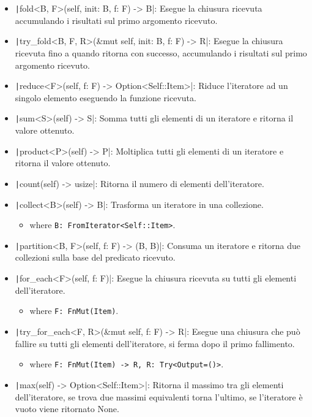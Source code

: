 \begin{itemize}
  \item \texttt|fold<B, F>(self, init: B, f: F) -> B|: Esegue la chiusura ricevuta accumulando i risultati sul primo argomento ricevuto.
  \item \texttt|try_fold<B, F, R>(&mut self, init: B, f: F) -> R|: Esegue la chiusura ricevuta fino a quando ritorna con successo, accumulando i risultati sul primo argomento ricevuto.
  \item \texttt|reduce<F>(self, f: F) -> Option<Self::Item>|: Riduce l'iteratore ad un singolo elemento eseguendo la funzione ricevuta.
  \item \texttt|sum<S>(self) -> S|: Somma tutti gli elementi di un iteratore e ritorna il valore ottenuto.
  \item \texttt|product<P>(self) -> P|: Moltiplica tutti gli elementi di un iteratore e ritorna il valore ottenuto.
  \item \texttt|count(self) -> usize|: Ritorna il numero di elementi dell'iteratore.
  \item \texttt|collect<B>(self) -> B|: Trasforma un iteratore in una collezione.
        \begin{itemize}
          \item[] where \verb|B: FromIterator<Self::Item>|.
        \end{itemize}
  \item \texttt|partition<B, F>(self, f: F) -> (B, B)|: Consuma un iteratore e ritorna due collezioni sulla base del predicato ricevuto.
  \item \texttt|for_each<F>(self, f: F)|: Esegue la chiusura ricevuta su tutti gli elementi dell'iteratore.
        \begin{itemize}
          \item[] where \verb|F: FnMut(Item)|.
        \end{itemize}
  \item \texttt|try_for_each<F, R>(&mut self, f: F) -> R|: Esegue una chiusura che può fallire su tutti gli elementi dell'iteratore, si ferma dopo il primo fallimento.
        \begin{itemize}
          \item[] where \verb|F: FnMut(Item) -> R, R: Try<Output=()>|.
        \end{itemize}
  \item \texttt|max(self) -> Option<Self::Item>|: Ritorna il massimo tra gli elementi dell'iteratore, se trova due massimi equivalenti torna l'ultimo, se l'iteratore è vuoto viene ritornato None.

\end{itemize}
